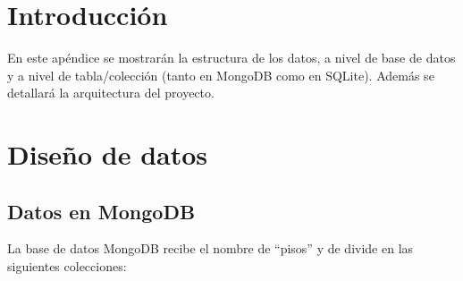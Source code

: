 \section{Introducción}

En este apéndice se mostrarán la estructura de los datos, a nivel de base de datos y a nivel de tabla/colección (tanto en MongoDB como en SQLite). Además se detallará la arquitectura del proyecto.

\section{Diseño de datos}

\subsection{Datos en MongoDB}

La base de datos MongoDB recibe el nombre de ``pisos'' y de divide en las siguientes colecciones:


